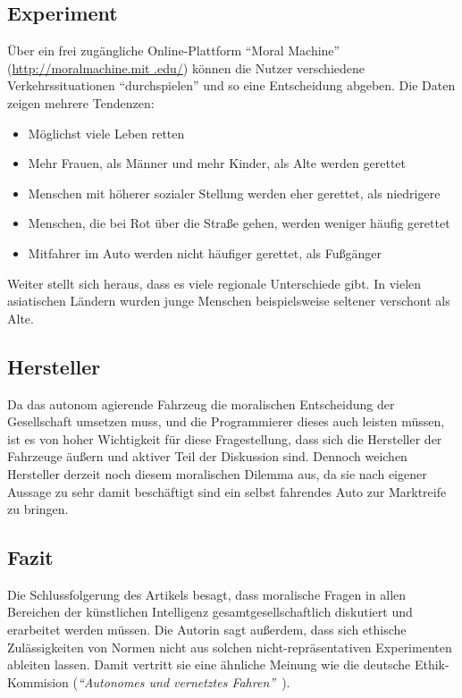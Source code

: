 \documentclass[11pt]{article}
\begin{document}
    \subsection{Experiment}
    Über ein frei zugängliche Online-Plattform "`Moral Machine"' \\(\url{http://moralmachine.mit
    .edu/}) können die Nutzer verschiedene Verkehrssituationen "`durchspielen"' und so eine
    Entscheidung
    abgeben. Die Daten zeigen mehrere Tendenzen:
    \begin{itemize}
        \item Möglichst viele Leben retten
        \item Mehr Frauen, als Männer und mehr Kinder, als Alte werden gerettet
        \item Menschen mit höherer sozialer Stellung werden eher gerettet, als niedrigere
        \item Menschen, die bei Rot über die Straße gehen, werden weniger häufig gerettet
        \item Mitfahrer im Auto werden nicht häufiger gerettet, als Fußgänger
    \end{itemize}
    Weiter stellt sich heraus, dass es viele regionale Unterschiede gibt. In vielen asiatischen
    Ländern
    wurden junge Menschen beispielsweise seltener verschont als Alte.

    \subsection{Hersteller}
    Da das autonom agierende Fahrzeug die moralischen Entscheidung der Gesellschaft umsetzen muss,
    und die Programmierer dieses auch leisten müssen, ist es von hoher Wichtigkeit für diese
    Fragestellung, dass sich die Hersteller der Fahrzeuge äußern und
    aktiver Teil der Diskussion sind. Dennoch weichen Hersteller derzeit noch diesem moralischen
    Dilemma aus, da sie nach eigener Aussage zu sehr damit beschäftigt sind ein selbst fahrendes
    Auto zur Marktreife zu bringen.

    \subsection{Fazit}
    Die Schlussfolgerung des Artikels besagt, dass moralische Fragen in allen Bereichen der
    künstlichen Intelligenz gesamtgesellschaftlich diskutiert und erarbeitet werden müssen. Die
    Autorin sagt außerdem, dass sich ethische Zulässigkeiten von Normen nicht aus
    solchen nicht-repräsentativen Experimenten ableiten lassen. Damit vertritt sie eine ähnliche
    Meinung wie die deutsche Ethik-Kommision (\textit{"`Autonomes und vernetztes
    Fahren"'}~\cite{fahren}).
\end{document}
